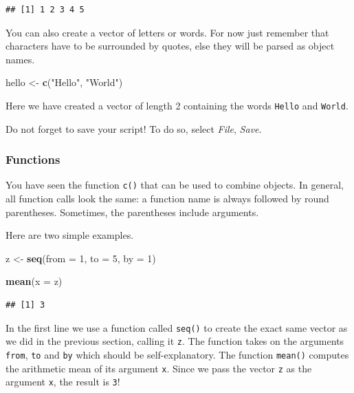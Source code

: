 \documentclass[]{book}
\newenvironment{Shaded}{\begin{snugshade}}{\end{snugshade}}
\newcommand{\KeywordTok}[1]{\textcolor[rgb]{0.13,0.29,0.53}{\textbf{#1}}}
\newcommand{\DataTypeTok}[1]{\textcolor[rgb]{0.13,0.29,0.53}{#1}}
\newcommand{\DecValTok}[1]{\textcolor[rgb]{0.00,0.00,0.81}{#1}}
\newcommand{\StringTok}[1]{\textcolor[rgb]{0.31,0.60,0.02}{#1}}
\newcommand{\NormalTok}[1]{#1}
\theoremstyle{definition}
\theoremstyle{definition}
\theoremstyle{definition}
\theoremstyle{remark}
\begin{document}
\begin{verbatim}
## [1] 1 2 3 4 5
\end{verbatim}

You can also create a vector of letters or words. For now just remember
that characters have to be surrounded by quotes, else they will be
parsed as object names.

\begin{Shaded}
\begin{Highlighting}[]
\NormalTok{hello <-}\StringTok{ }\KeywordTok{c}\NormalTok{(}\StringTok{"Hello"}\NormalTok{, }\StringTok{"World"}\NormalTok{)}
\end{Highlighting}
\end{Shaded}

Here we have created a vector of length 2 containing the words
\texttt{Hello} and \texttt{World}.

Do not forget to save your script! To do so, select \emph{File},
\emph{Save}.

\subsubsection*{Functions}\label{functions}

You have seen the function \texttt{c()} that can be used to combine
objects. In general, all function calls look the same: a function name
is always followed by round parentheses. Sometimes, the parentheses
include arguments.

Here are two simple examples.

\begin{Shaded}
\begin{Highlighting}[]
\NormalTok{z <-}\StringTok{ }\KeywordTok{seq}\NormalTok{(}\DataTypeTok{from =} \DecValTok{1}\NormalTok{, }\DataTypeTok{to =} \DecValTok{5}\NormalTok{, }\DataTypeTok{by =} \DecValTok{1}\NormalTok{)}

\KeywordTok{mean}\NormalTok{(}\DataTypeTok{x =}\NormalTok{ z)}
\end{Highlighting}
\end{Shaded}

\begin{verbatim}
## [1] 3
\end{verbatim}

In the first line we use a function called \texttt{seq()} to create the
exact same vector as we did in the previous section, calling it
\texttt{z}. The function takes on the arguments \texttt{from},
\texttt{to} and \texttt{by} which should be self-explanatory. The
function \texttt{mean()} computes the arithmetic mean of its argument
\texttt{x}. Since we pass the vector \texttt{z} as the argument
\texttt{x}, the result is \texttt{3}!
\end{document}
